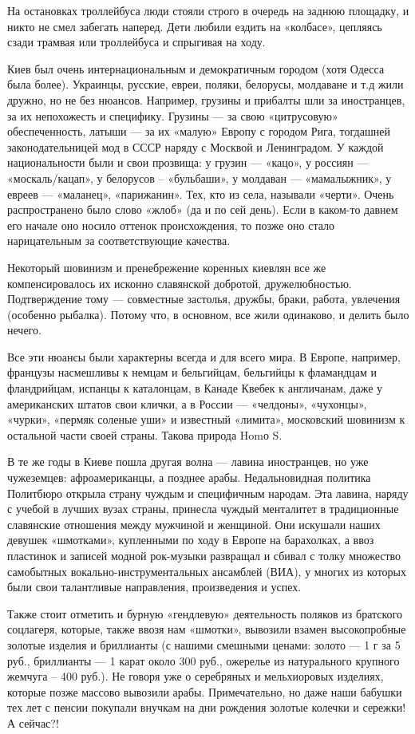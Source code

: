 На остановках троллейбуса люди стояли строго в очередь на заднюю площадку, и
никто не смел забегать наперед. Дети любили ездить на «колбасе», цепляясь сзади
трамвая или троллейбуса и спрыгивая на ходу. 

Киев был очень интернациональным и демократичным городом (хотя Одесса была
более). Украинцы, русские, евреи, поляки, белорусы, молдаване и т.д жили
дружно, но не без нюансов. Например, грузины и прибалты шли за иностранцев, за
их непохожесть и специфику. Грузины --- за свою «цитрусовую» обеспеченность,
латыши --- за их «малую» Европу с городом Рига, тогдашней законодательницей мод в
СССР наряду с Москвой и Ленинградом. У каждой национальности были и свои
прозвища: у грузин --- «кацо», у россиян --- «москаль/кацап», у белорусов –
«бульбаши», у молдаван --- «мамалыжник», у евреев --- «маланец», «парижанин». Тех,
кто из села, называли «черти». Очень распространено было слово «жлоб» (да и по
сей день). Если в каком-то давнем его начале оно носило оттенок происхождения,
то позже оно стало нарицательным за соответствующие качества. 

Некоторый шовинизм и пренебрежение коренных киевлян все же компенсировалось их
исконно славянской добротой, дружелюбностью. Подтверждение тому --- совместные
застолья, дружбы, браки, работа, увлечения (особенно рыбалка). Потому что, в
основном, все жили одинаково, и делить было нечего. 

Все эти нюансы были характерны всегда и для всего мира. В Европе, например,
французы насмешливы к немцам и бельгийцам, бельгийцы к фламандцам и
фландрийцам, испанцы к каталонцам, в Канаде Квебек к англичанам, даже у
американских штатов свои клички, а в России --- «челдоны», «чухонцы», «чурки»,
«пермяк соленые уши» и известный «лимита», московский шовинизм к остальной
части своей страны. Такова природа Homо S. 

В те же годы в Киеве пошла другая волна --- лавина иностранцев, но уже
чужеземцев: афроамериканцы, а позднее арабы. Недальновидная политика Политбюро
открыла страну чуждым и специфичным народам. Эта лавина, наряду с учебой в
лучших вузах страны, принесла чуждый менталитет в традиционные славянские
отношения между мужчиной и женщиной. Они искушали наших девушек «шмотками»,
купленными по ходу в Европе на барахолках, а ввоз пластинок и записей модной
рок-музыки развращал и сбивал с толку множество самобытных
вокально-инструментальных ансамблей (ВИА), у многих из которых были свои
талантливые направления, произведения и успех. 

Также стоит отметить и бурную «гендлевую» деятельность поляков из братского
соцлагеря, которые, также ввозя нам «шмотки», вывозили взамен высокопробные
золотые изделия и бриллианты (с нашими смешными ценами: золото --- 1 г за 5 руб.,
бриллианты --- 1 карат около 300 руб., ожерелье из натурального крупного жемчуга
– 400 руб.). Не говоря уже о серебряных и мельхиоровых изделиях, которые позже
массово вывозили арабы. Примечательно, но даже наши бабушки тех лет с пенсии
покупали внучкам на дни рождения золотые колечки и сережки! А сейчас?! 

